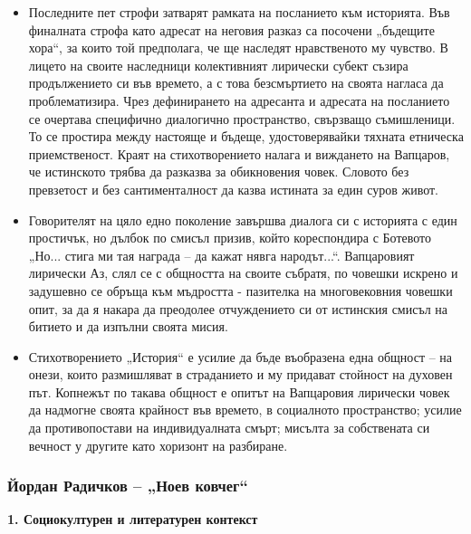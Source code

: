 \documentclass[12pt,a4paper]{article}
\begin{document}
\begin{itemize}[leftmargin=*]
\vspace{-0.45cm}
\item Последните пет строфи затварят рамката на посланието към историята. Във финалната строфа като адресат на неговия разказ са посочени „бъдещите хора“, за които той предполага, че ще наследят нравственото му чувство. В лицето на своите наследници колективният лирически субект съзира продължението си във времето, а с това безсмъртието на своята нагласа да проблематизира. Чрез дефинирането на адресанта и адресата на посланието се очертава специфично диалогично пространство, свързващо съмишленици. То се простира между настояще и бъдеще, удостоверявайки тяхната етническа приемственост. Краят на стихотворението налага и виждането на Вапцаров, че истинското трябва да разказва за обикновения човек. Словото без превзетост и без сантименталност да казва истината за един суров живот.
\end{itemize}

\begin{itemize}[leftmargin=*]
\vspace{-0.45cm}
\item Говорителят на цяло едно поколение завършва диалога си с историята с един простичък, но дълбок по смисъл призив, който кореспондира с Ботевото „Но... стига ми тая награда – да кажат нявга народът...“. Вапцаровият лирически Аз, слял се с общността на своите събратя, по човешки искрено и задушевно се обръща към мъдростта - пазителка на многовековния човешки опит, за да я накара да преодолее отчуждението си от истинския смисъл на битието и да изпълни своята мисия.
\end{itemize}

\begin{itemize}[leftmargin=*]
\vspace{-0.45cm}
\item Стихотворението „История“ е усилие да бъде въобразена една общност – на онези, които размишляват в страданието и му придават стойност на духовен път. Копнежът по такава общност е опитът на Вапцаровия лирически човек да надмогне своята крайност във времето, в социалното пространство; усилие да противопостави на индивидуалната смърт; мисълта за собствената си вечност у другите като хоризонт на разбиране.
\end{itemize}
\newpage

\subsubsection{\colorbox{green!40}{Йордан Радичков – „Ноев ковчег“}}
\textbf{1. Социокултурен и литературен контекст}
\vspace{0.1cm}
 
\end{document}
